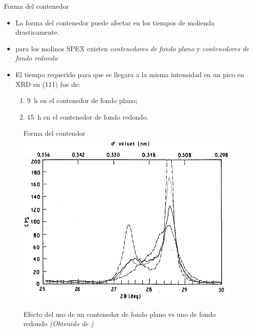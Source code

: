 \documentclass[%
spanish,
    progressbar=head,
background=dark,
subsectionpage
]{beamer}
\begin{document}
\begin{frame}{Forma del contenedor}
\begin{itemize}
    \item<1-> La forma del contenedor puede afectar en los tiempos de molienda drasticamente.
    \item<2-> para los molinos SPEX existen \emph{contenedores de fondo plano} y \emph{contenedores de fondo redondo}
    \item<3-> El tiempo requerido para que se llegara a la misma intensidad en un pico en XRD en (111) fue de:
    \begin{enumerate}
        \item \qty{9}{\hour} en el contenedor de fondo plano;
        \item \qty{15}{\hour} en el contenedor de fondo redondo.
    \end{enumerate}
\end{itemize}
\end{frame}
\begin{frame}
    \begin{figure}{Forma del contendor}
        \centering
        \includegraphics[width=0.85\linewidth]{figuras/efectoXRD.png}
        \caption{Efecto del uso de un contenedor de fondo plano vs uno de fondo redondo \textit{(Obtenido de \cite{harringa1992effects})}}
    \end{figure}
\end{frame}
\end{document}
